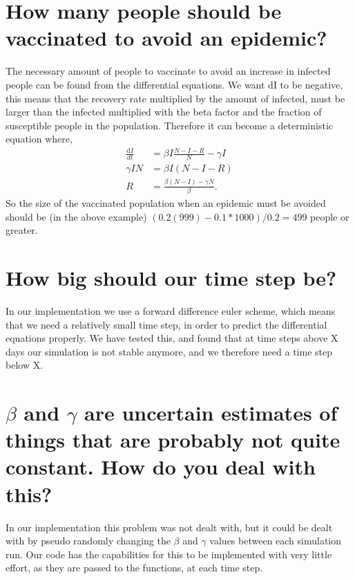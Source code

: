 \documentclass{article}
\begin{document}
\section*{How many people should be vaccinated to avoid an epidemic?}
The necessary amount of people to vaccinate to avoid an increase in infected people can be found from the differential equations. We want dI to be negative, this means that the recovery rate multiplied by the amount of infected, must be larger than the infected multiplied with the beta factor and the fraction of susceptible people in the population. Therefore it can become a deterministic equation where,
\begin{align}
    \frac{\text{d}I}{dt} &= \beta I \frac{N-I-R}{N} - \gamma I\\
 \gamma I N&=    \beta I (N-I-R) \\
     R &= \frac{\beta(N-I) - \gamma N}{\beta}.
\end{align}
So the size of the vaccinated population when an epidemic must be avoided should be (in the above example) $(0.2(999)-0.1*1000)/0.2 = 499$ people or greater.

\section*{How big should our time step be?}
In our implementation we use a forward difference euler scheme, which means that we need a relatively small time step, in order to predict the differential equations properly. We have tested this, and found that at time steps above X %
days our simulation is not stable anymore, and we therefore need a time step below X.

\section*{$\beta$ and $\gamma$ are uncertain estimates of things that are probably not quite constant. How
do you deal with this?}
In our implementation this problem was not dealt with, but it could be dealt with by pseudo randomly changing the $\beta$ and $\gamma$ values between each simulation run. Our code has the capabilities for this to be implemented with very little effort, as they are passed to the functions, at each time step.
\end{document}
